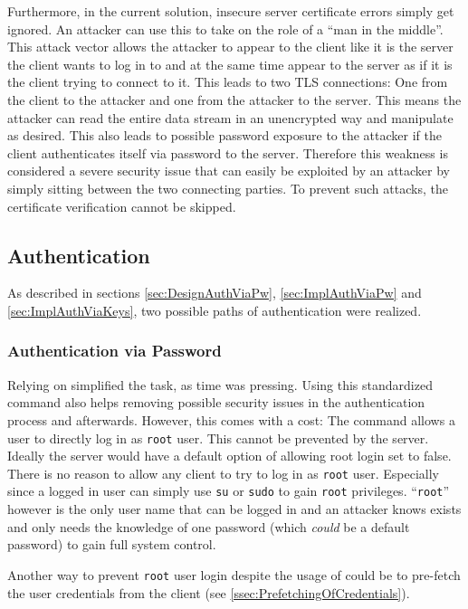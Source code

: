\documentclass[10pt,a4paper,titlepage,twoside,english,final]{zhawreprt}
\begin{document}
Furthermore, in the current solution, insecure server certificate errors simply get ignored.
An attacker can use this to take on the role of a ``man in the middle''.
This attack vector allows the attacker to appear to the client like it is the server the client wants to log in to and at the same time appear to the server as if it is the client trying to connect to it.
This leads to two \gls{TLS} connections:
One from the client to the attacker and one from the attacker to the server.
This means the attacker can read the entire data stream in an unencrypted way and manipulate as desired.
This also leads to possible password exposure to the attacker if the client authenticates itself via password to the server.
Therefore this weakness is considered a severe security issue that can easily be exploited by an attacker by simply sitting between the two connecting parties.
To prevent such attacks, the certificate verification cannot be skipped.


\subsection{Authentication}\label{ssec:SecAuthentication}
As described in sections \ref{sec:DesignAuthViaPw}, \ref{sec:ImplAuthViaPw} and \ref{sec:ImplAuthViaKeys}, two possible paths of authentication were realized.

\subsubsection{Authentication via Password}\label{sssec:SecAuthViaPw}
Relying on \cite{login} simplified the task, as time was pressing.
Using this standardized command also helps removing possible security issues in the authentication process and afterwards.
However, this comes with a cost:
The \cite{login} command allows a user to directly log in as \texttt{root} user.
This cannot be prevented by the server.
Ideally the server would have a default option of allowing root login set to false.
There is no reason to allow any client to try to log in as \texttt{root} user.
Especially since a logged in user can simply use \texttt{su} or \texttt{sudo} to gain \texttt{root} privileges.
``\texttt{root}'' however is the only user name that can be logged in and an attacker knows exists and only needs the knowledge of one password (which \textit{could} be a default password) to gain full system control.

Another way to prevent \texttt{root} user login despite the usage of \cite{login} could be to pre-fetch the user credentials from the client (see \ref{ssec:PrefetchingOfCredentials}).
\end{document}
